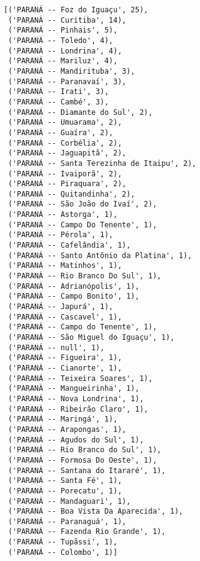 \documentclass[11pt]{article}
\makeatletter
\newcommand{\boxspacing}{\kern\kvtcb@left@rule\kern\kvtcb@boxsep}
\newcommand{\prompt}[4]{
        \ttfamily\llap{{\color{#2}[#3]:\hspace{3pt}#4}}\vspace{-\baselineskip}
    }
\makeatother
\begin{document}
            \begin{tcolorbox}[breakable, size=fbox, boxrule=.5pt, pad at break*=1mm, opacityfill=0]
\prompt{Out}{outcolor}{9}{\boxspacing}
\begin{Verbatim}[commandchars=\\\{\}]
[('PARANÁ -- Foz do Iguaçu', 25),
 ('PARANÁ -- Curitiba', 14),
 ('PARANÁ -- Pinhais', 5),
 ('PARANÁ -- Toledo', 4),
 ('PARANÁ -- Londrina', 4),
 ('PARANÁ -- Mariluz', 4),
 ('PARANÁ -- Mandirituba', 3),
 ('PARANÁ -- Paranavaí', 3),
 ('PARANÁ -- Irati', 3),
 ('PARANÁ -- Cambé', 3),
 ('PARANÁ -- Diamante do Sul', 2),
 ('PARANÁ -- Umuarama', 2),
 ('PARANÁ -- Guaíra', 2),
 ('PARANÁ -- Corbélia', 2),
 ('PARANÁ -- Jaguapitã', 2),
 ('PARANÁ -- Santa Terezinha de Itaipu', 2),
 ('PARANÁ -- Ivaiporã', 2),
 ('PARANÁ -- Piraquara', 2),
 ('PARANÁ -- Quitandinha', 2),
 ('PARANÁ -- São João do Ivaí', 2),
 ('PARANÁ -- Astorga', 1),
 ('PARANÁ -- Campo Do Tenente', 1),
 ('PARANÁ -- Pérola', 1),
 ('PARANÁ -- Cafelândia', 1),
 ('PARANÁ -- Santo Antônio da Platina', 1),
 ('PARANÁ -- Matinhos', 1),
 ('PARANÁ -- Rio Branco Do Sul', 1),
 ('PARANÁ -- Adrianópolis', 1),
 ('PARANÁ -- Campo Bonito', 1),
 ('PARANÁ -- Japurá', 1),
 ('PARANÁ -- Cascavel', 1),
 ('PARANÁ -- Campo do Tenente', 1),
 ('PARANÁ -- São Miguel do Iguaçu', 1),
 ('PARANÁ -- null', 1),
 ('PARANÁ -- Figueira', 1),
 ('PARANÁ -- Cianorte', 1),
 ('PARANÁ -- Teixeira Soares', 1),
 ('PARANÁ -- Mangueirinha', 1),
 ('PARANÁ -- Nova Londrina', 1),
 ('PARANÁ -- Ribeirão Claro', 1),
 ('PARANÁ -- Maringá', 1),
 ('PARANÁ -- Arapongas', 1),
 ('PARANÁ -- Agudos do Sul', 1),
 ('PARANÁ -- Rio Branco do Sul', 1),
 ('PARANÁ -- Formosa Do Oeste', 1),
 ('PARANÁ -- Santana do Itararé', 1),
 ('PARANÁ -- Santa Fé', 1),
 ('PARANÁ -- Porecatu', 1),
 ('PARANÁ -- Mandaguari', 1),
 ('PARANÁ -- Boa Vista Da Aparecida', 1),
 ('PARANÁ -- Paranaguá', 1),
 ('PARANÁ -- Fazenda Rio Grande', 1),
 ('PARANÁ -- Tupãssi', 1),
 ('PARANÁ -- Colombo', 1)]
\end{Verbatim}
\end{tcolorbox}
        
\end{document}
